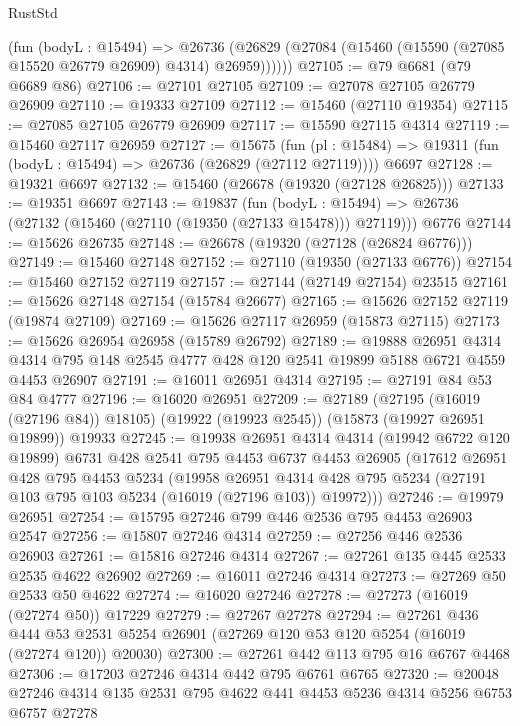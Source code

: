 \begin{lexlean}{RustStd}
\begin{coremodule}
        (fun (bodyL : @15494) =>
        @26736 (@26829 (@27084 (@15460 (@15590 (@27085 @15520 @26779 @26909) @4314) @26959))))))
@27105 := @79 @6681 (@79 @6689 @86)
@27106 := @27101 @27105
@27109 := @27078 @27105 @26779 @26909
@27110 := @19333 @27109
@27112 := @15460 (@27110 @19354)
@27115 := @27085 @27105 @26779 @26909
@27117 := @15590 @27115 @4314
@27119 := @15460 @27117 @26959
@27127 := @15675
    (fun (pl : @15484) => @19311 (fun (bodyL : @15494) => @26736 (@26829 (@27112 @27119))))
    @6697
@27128 := @19321 @6697
@27132 := @15460 (@26678 (@19320 (@27128 @26825)))
@27133 := @19351 @6697
@27143 := @19837
    (fun (bodyL : @15494) => @26736 (@27132 (@15460 (@27110 (@19350 (@27133 @15478))) @27119)))
    @6776
@27144 := @15626 @26735
@27148 := @26678 (@19320 (@27128 (@26824 @6776)))
@27149 := @15460 @27148
@27152 := @27110 (@19350 (@27133 @6776))
@27154 := @15460 @27152 @27119
@27157 := @27144 (@27149 @27154) @23515
@27161 := @15626 @27148 @27154 (@15784 @26677)
@27165 := @15626 @27152 @27119 (@19874 @27109)
@27169 := @15626 @27117 @26959 (@15873 @27115)
@27173 := @15626 @26954 @26958 (@15789 @26792)
@27189 := @19888
    @26951
    @4314
    @4314
    @795
    @148
    @2545
    @4777
    @428
    @120
    @2541
    @19899
    @5188
    @6721
    @4559
    @4453
    @26907
@27191 := @16011 @26951 @4314
@27195 := @27191 @84 @53 @84 @4777
@27196 := @16020 @26951
@27209 := @27189
    (@27195 (@16019 (@27196 @84)) @18105)
    (@19922 (@19923 @2545))
    (@15873 (@19927 @26951 @19899))
    @19933
@27245 := @19938
    @26951
    @4314
    @4314
    (@19942 @6722 @120 @19899)
    @6731
    @428
    @2541
    @795
    @4453
    @6737
    @4453
    @26905
    (@17612
      @26951
      @428
      @795
      @4453
      @5234
      (@19958
        @26951
        @4314
        @428
        @795
        @5234
        (@27191 @103 @795 @103 @5234 (@16019 (@27196 @103)) @19972)))
@27246 := @19979 @26951
@27254 := @15795 @27246 @799 @446 @2536 @795 @4453 @26903 @2547
@27256 := @15807 @27246 @4314
@27259 := @27256 @446 @2536 @26903
@27261 := @15816 @27246 @4314
@27267 := @27261 @135 @445 @2533 @2535 @4622 @26902
@27269 := @16011 @27246 @4314
@27273 := @27269 @50 @2533 @50 @4622
@27274 := @16020 @27246
@27278 := @27273 (@16019 (@27274 @50)) @17229
@27279 := @27267 @27278
@27294 := @27261
    @436
    @444
    @53
    @2531
    @5254
    @26901
    (@27269 @120 @53 @120 @5254 (@16019 (@27274 @120)) @20030)
@27300 := @27261 @442 @113 @795 @16 @6767 @4468
@27306 := @17203 @27246 @4314 @442 @795 @6761 @6765
@27320 := @20048 @27246 @4314 @135 @2531 @795 @4622 @441 @4453 @5236 @4314 @5256 @6753 @6757 @27278

\end{coremodule}
\end{lexlean}
